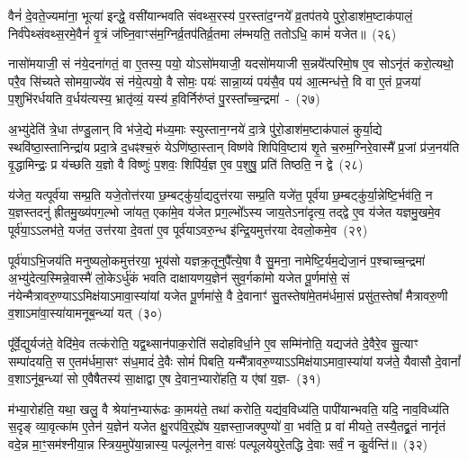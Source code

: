 वैनं॑ दे॒वते॒ज्यमा॑ना॒ भूत्या॑ इन्द्धे॒ वसी॑यान्भवति संवथ्स॒रस्य॑ प॒रस्ता॑\-द॒ग्नये᳚ व्र॒तप॑तये पुरो॒डाश॑\-म॒ष्टा\-क॑पालं॒ निर्व॑पेथ्संवथ्स॒रमे॒वैनं॑ वृ॒त्रं ज॑घ्नि॒वाꣳस॑म॒ग्निर्व्र॒तप॑तिर्व्र॒तमा ल॑म्भयति॒ ततो\-ऽधि॒ कामं॑ यजेत॥~(२६)

{\anuvakamend[{ए॒तान्तदौदु॑म्बर॒ꣴ॒ स्वा त्रि॒ꣳ॒शच्च॑}]}%

नासो॑मयाजी॒ सं न॑ये॒दना॑गतं॒ वा ए॒तस्य॒ पयो॒ यो\-ऽसो॑मयाजी॒ यदसो॑मयाजी स॒न्नये᳚त्परिमो॒ष ए॒व सो\-ऽनृ॑तं करो॒त्यथो॒ परै॒व सि॑च्यते सोमया॒ज्ये॑व सं न॑ये॒त्पयो॒ वै सोमः॒ पयः॑ सान्ना॒य्यं पय॑सै॒व पय॑ आ॒त्मन्ध॑त्ते॒ वि वा ए॒तं प्र॒जया॑ प॒शुभि॑रर्धयति व॒र्धय॑त्यस्य॒ भ्रातृ॑व्यं॒ यस्य॑ ह॒विर्निरु॑प्तं पु॒रस्ता᳚च्च॒न्द्रमा॑~-~(२७)

अ॒भ्यु॑देति॑ त्रे॒धा त॑ण्डु॒लान् वि भ॑जे॒द्ये म॑ध्य॒माः स्युस्तान॒ग्नये॑ दा॒त्रे पु॑रो॒डाश॑म॒ष्टाक॑पालं कुर्या॒द्ये स्थवि॑ष्ठा॒स्तानिन्द्रा॑य प्रदा॒त्रे द॒धꣴश्च॒रुं ये\-ऽणि॑ष्ठा॒स्तान् विष्ण॑वे शिपिवि॒ष्टाय॑ शृ॒ते च॒रुम॒ग्निरे॒वास्मै᳚ प्र॒जां प्र॑ज॒नय॑ति वृ॒द्धामिन्द्रः॒ प्र य॑च्छति य॒ज्ञो वै विष्णुः॑ प॒शवः॒ शिपि॑र्य॒ज्ञ ए॒व प॒शुषु॒ प्रति॑ तिष्ठति॒ न द्वे~(२८)

य॑जेत॒ यत्पूर्व॑या सम्प्र॒ति यजे॒तोत्त॑रया छ॒म्बट्कु॑र्या॒द्यदुत्त॑रया सम्प्र॒ति यजे॑त॒ पूर्व॑या छ॒म्बट्कु॑र्या॒न्नेष्टि॒र्भव॑ति॒ न य॒ज्ञस्तदनु॑ ह्रीतमु॒ख्य॑पग॒ल्भो जा॑यत॒ एका॑मे॒व य॑जेत प्रग॒ल्भो᳚\-ऽस्य जाय॒ते\-ऽना॑दृत्य॒ तद्द्वे ए॒व य॑जेत यज्ञमु॒खमे॒व पूर्व॑या॒ऽऽलभ॑ते॒ यज॑त॒ उत्त॑रया दे॒वता॑ ए॒व पूर्व॑या\-ऽवरु॒न्ध इ॑न्द्रि॒यमुत्त॑रया देवलो॒कमे॒व~(२९)

पूर्व॑याऽभि॒जय॑ति मनुष्यलो॒कमुत्त॑रया॒ भूय॑सो यज्ञक्र॒तूनुपै᳚त्ये॒षा वै सु॒मना॒ नामेष्टि॒र्यम॒द्येजा॒नं प॒श्चाच्च॒न्द्रमा॑ अ॒भ्यु॑देत्य॒स्मिन्ने॒वास्मै॑ लो॒के\-ऽर्धु॑कं भवति दाक्षायणय॒ज्ञेन॑ सुव॒र्गका॑मो यजेत पू॒र्णमा॑से॒ सं न॑येन्मैत्रावरु॒ण्या\-ऽ\-ऽ\-मिक्ष॑याऽमावा॒स्या॑यां यजेत पू॒र्णमा॑से॒ वै दे॒वानाꣳ॑ सु॒तस्तेषा॑मे॒तम॑र्धमा॒सं प्रसु॑त॒स्तेषां᳚ मैत्रावरु॒णी व॒शाऽमा॑वा॒स्या॑यामनूब॒न्ध्या॑ यत्~(३०)

पू᳚र्वे॒द्युर्यज॑ते॒ वेदि॑मे॒व तत्क॑रोति॒ यद्व॒थ्सान॑पाक॒रोति॑ सदोहविर्धा॒ने ए॒व सम्मि॑नोति॒ यद्यज॑ते दे॒वैरे॒व सु॒त्याꣳ सम्पा॑दयति॒ स ए॒तम॑र्धमा॒सꣳ स॑ध॒मादं॑ दे॒वैः सोमं॑ पिबति॒ यन्मै᳚त्रावरु॒ण्या\-ऽ\-ऽ\-मिक्ष॑याऽमावा॒स्या॑यां यज॑ते॒ यैवासौ दे॒वानां᳚ व॒शाऽनू॑ब॒न्ध्या॑ सो ए॒वैषैतस्य॑ सा॒क्षाद्वा ए॒ष दे॒वान॒भ्यारो॑हति॒ य ए॑षां य॒ज्ञ-~(३१)

म॑भ्या॒रोह॑ति॒ यथा॒ खलु॒ वै श्रेया॑न॒भ्यारू॑ढः का॒मय॑ते॒ तथा॑ करोति॒ यद्य॑व॒विध्य॑ति॒ पापी॑यान्भवति॒ यदि॒ नाव॒विध्य॑ति स॒दृङ् व्या॒वृत्का॑म ए॒तेन॑ य॒ज्ञेन॑ यजेत क्षु॒रप॑वि॒र्॒\mbox{}ह्ये॑ष य॒ज्ञस्ता॒जक्पुण्यो॑ वा॒ भव॑ति॒ प्र वा॑ मीयते॒ तस्यै॒तद्व्र॒तं नानृ॑तं वदे॒न्न मा॒ꣳ॒सम॑श्नीया॒न्न स्त्रिय॒\-मु\-पे॑या॒न्नास्य॒ पल्पू॑लनेन॒ वासः॑ पल्पूलयेयुरे॒तद्धि दे॒वाः सर्वं॒ न कु॒र्वन्ति॑॥~(३२)

